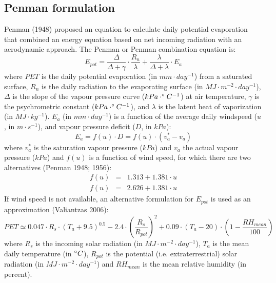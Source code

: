 \documentclass[11pt,a4paper]{article}
\begin{document}
\subsection{Penman formulation}
Penman (1948) proposed an equation to calculate daily potential evaporation that combined an energy equation based on net incoming radiation with an aerodynamic approach. The Penman or Penman combination equation is:
\begin{equation}
E_{pot} = \frac{\Delta}{\Delta+\gamma}\cdot \frac{R_n}{\lambda}+\frac{\lambda}{\Delta + \lambda}\cdot E_a
\end{equation}
where $PET$ is the daily potential evaporation (in $mm \cdot day^{-1}$) from a saturated surface, $R_{n}$ is the daily radiation to the evaporating surface (in $MJ\cdot m^{-2}\cdot day^{-1}$), $\Delta$ is the slope of the vapour pressure curve ($kPa\cdot \degree C^{-1}$) at air temperature, $\gamma$ is the psychrometric constant ($kPa\cdot \degree C^{-1}$), and $\lambda$ is the latent heat of vaporization (in $MJ\cdot kg^{-1}$). $E_a$  (in $mm \cdot day^{-1}$) is a function of the average daily windspeed ($u$, in $m\cdot s^{-1}$), and vapour pressure deficit ($D$, in $kPa$):
\begin{equation}
E_a = f(u) \cdot D = f(u) \cdot (v_a^*-v_a)
\end{equation}
where $v_a^*$ is the saturation vapour pressure ($kPa$) and $v_a$ the actual vapour pressure ($kPa$) and $f(u)$ is a function of wind speed, for which there are two alternatives (Penman 1948; 1956):
\begin{eqnarray}
f(u) &=& 1.313 + 1.381 \cdot u\\
f(u) &=& 2.626 + 1.381 \cdot u
\end{eqnarray}
If wind speed is not available, an alternative formulation for $E_{pot}$ is used as an approximation (Valiantzas 2006):
\begin{equation}
PET \simeq 0.047\cdot R_s \cdot (T_a+9.5)^{0.5}-2.4\cdot (\frac{R_s}{R_{pot}})^2+0.09\cdot(T_a-20)\cdot(1-\frac{RH_{mean}}{100})
\end{equation}
where $R_s$ is the incoming solar radiation (in $MJ\cdot m^{-2}\cdot day^{-1}$), $T_a$ is the mean daily temperature (in $\degree C$), $R_{pot}$ is the potential (i.e. extraterrestrial) solar radiation (in $MJ\cdot m^{-2}\cdot day^{-1}$) and $RH_{mean}$ is the mean relative humidity (in percent). 
\end{document}
